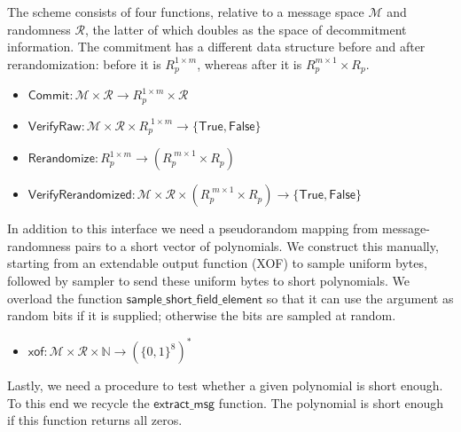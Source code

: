 The scheme consists of four functions, relative to a message space $\mathcal{M}$ and randomness $\mathcal{R}$, the latter of which doubles as the space of decommitment information. The commitment has a different data structure before and after rerandomization: before it is $R_p^{1 \times m}$, whereas after it is $R_p^{m \times 1} \times R_p$.
\begin{itemize}
\item $\mathsf{Commit} : \mathcal{M} \times \mathcal{R} \rightarrow R_p^{1 \times m} \times \mathcal{R}$
\item $\mathsf{VerifyRaw} : \mathcal{M} \times \mathcal{R} \times R_p^{\phantom{\vert}1 \times m} \rightarrow \{\mathsf{True},\mathsf{False}\}$
\item $\mathsf{Rerandomize} : R_p^{1 \times m} \rightarrow (R_p^{\phantom{\vert}m \times 1} \times R_p)$
\item $\mathsf{VerifyRerandomized} : \mathcal{M} \times \mathcal{R} \times (R_p^{\phantom{\vert}m \times 1} \times R_p) \rightarrow \{\mathsf{True},\mathsf{False}\}$
\end{itemize}
In addition to this interface we need a pseudorandom mapping from message-randomness pairs to a short vector of polynomials. We construct this manually, starting from an extendable output function (XOF) to sample uniform bytes, followed by sampler to send these uniform bytes to short polynomials. We overload the function $\mathsf{sample\_short\_field\_element}$ so that it can use the argument as random bits if it is supplied; otherwise the bits are sampled at random.
\begin{itemize}
\item $\mathsf{xof} : \mathcal{M} \times \mathcal{R} \times \mathbb{N} \rightarrow (\{0, 1\}^8)^*$
\end{itemize}
Lastly, we need a procedure to test whether a given polynomial is short enough. To this end we recycle the $\mathsf{extract\_msg}$ function. The polynomial is short enough if this function returns all zeros.


